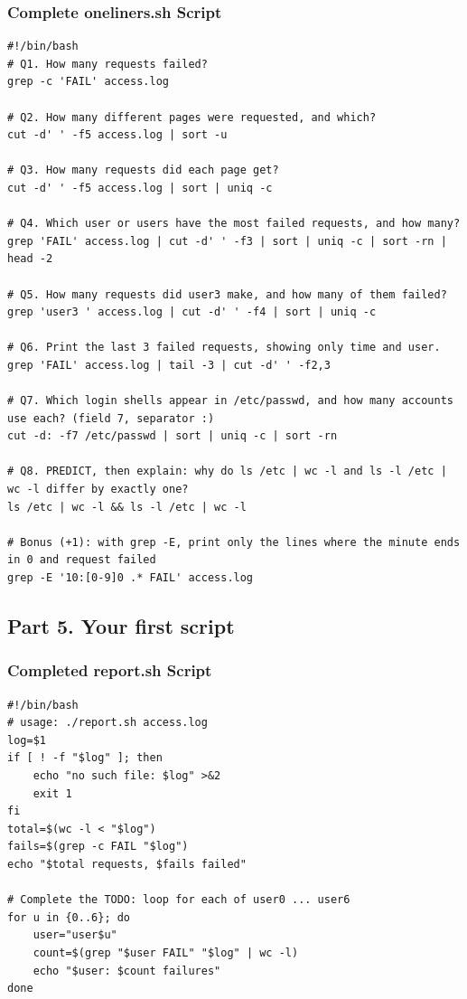 \documentclass{labreport}
\begin{document}
\subsubsection*{Complete oneliners.sh Script}
\begin{lstlisting}[style=bash]
#!/bin/bash
# Q1. How many requests failed?
grep -c 'FAIL' access.log

# Q2. How many different pages were requested, and which?
cut -d' ' -f5 access.log | sort -u

# Q3. How many requests did each page get?
cut -d' ' -f5 access.log | sort | uniq -c

# Q4. Which user or users have the most failed requests, and how many?
grep 'FAIL' access.log | cut -d' ' -f3 | sort | uniq -c | sort -rn | head -2

# Q5. How many requests did user3 make, and how many of them failed?
grep 'user3 ' access.log | cut -d' ' -f4 | sort | uniq -c

# Q6. Print the last 3 failed requests, showing only time and user.
grep 'FAIL' access.log | tail -3 | cut -d' ' -f2,3

# Q7. Which login shells appear in /etc/passwd, and how many accounts use each? (field 7, separator :)
cut -d: -f7 /etc/passwd | sort | uniq -c | sort -rn

# Q8. PREDICT, then explain: why do ls /etc | wc -l and ls -l /etc | wc -l differ by exactly one?
ls /etc | wc -l && ls -l /etc | wc -l

# Bonus (+1): with grep -E, print only the lines where the minute ends in 0 and request failed
grep -E '10:[0-9]0 .* FAIL' access.log
\end{lstlisting}

\subsection{Part 5. Your first script}

\subsubsection{Completed report.sh Script}
\begin{lstlisting}[style=bash]
#!/bin/bash
# usage: ./report.sh access.log
log=$1
if [ ! -f "$log" ]; then
    echo "no such file: $log" >&2
    exit 1
fi
total=$(wc -l < "$log")
fails=$(grep -c FAIL "$log")
echo "$total requests, $fails failed"

# Complete the TODO: loop for each of user0 ... user6
for u in {0..6}; do
    user="user$u"
    count=$(grep "$user FAIL" "$log" | wc -l)
    echo "$user: $count failures"
done
\end{lstlisting}
\end{document}

